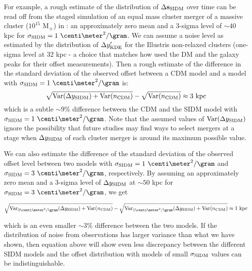 \documentclass[usenatbib]{mn2e}
\newcommand{\offset}{\Delta {\bf s}}
\newcommand{\SIDM}{{\rm SIDM}}
\newcommand{\Var}{\mathrm{Var}}
\begin{document}
{For example, a rough estimate of the distribution of $\offset_\SIDM$ over time 
can be read off from the staged simulation of an equal mass cluster merger of a
massive cluster ($10^{15}$ M$_\sun$) in \cite{Kim:2016}: an approximately zero mean and a 3-sigma level of
$\sim 40$ kpc for $\sigma_\SIDM = 1~\centi\meter^2 / \gram$.  
We can assume a noise level as estimated by the distribution of $\Delta y_{\rm KDE}'$
for the Illustris non-relaxed clusters (one-sigma level at 32 kpc - a choice that matches 
how \cite{Kim:2016} used the DM and the galaxy peaks for their offset measurements). 
Then a rough estimate of the difference in the standard deviation of the observed offset 
between a CDM model and a model with $\sigma_\SIDM = 1~\centi\meter^2 / \gram$ is:
\begin{equation}
\sqrt{\Var(\Delta y_\SIDM) + \Var(n_{\rm CDM})} - \sqrt{\Var(n_{\rm CDM})}  \approx 3~\mathrm{kpc} 
\end{equation}
which is a subtle $\sim 9 \%$ difference between the CDM and the SIDM model with
$\sigma_\SIDM = 1~\centi \meter^2 / \gram$. 
Note that the assumed values of $\Var(\Delta y_\SIDM)$  
ignore the possibility
that future studies may find ways to select mergers at a stage when $\Delta y_\SIDM$
of each cluster merger is around its maximum possible value. 

We can also estimate the difference of the standard deviation of the observed
offset level between two models with 
$\sigma_\SIDM =1~\centi\meter^2 / \gram$ and  $\sigma_\SIDM = 3~\centi\meter^2 / \gram$, respectively.
By assuming an approximately zero mean and a 3-sigma level of $\Delta y_\SIDM$
at $\sim 50$ kpc for $\sigma_\SIDM =
3~\centi\meter^2 / \gram$, we get

\begin{dmath}
\nonumber
	\sqrt{\Var_{3\centi\meter^2/\gram}(\Delta y_\SIDM) + \Var(n_{\rm CDM})} \hfill -
	\nonumber
	 \sqrt{\Var_{1\centi\meter^2/\gram}(\Delta y_{\SIDM}) +\Var(n_{\rm
	CDM})}\label{eq:variance_difference} \approx 1~\mathrm{kpc} 
\label{eq:variance_difference} 
\end{dmath}


which is an even smaller $\sim 3\%$ difference between the two models. 
If the distribution of noise from observations has larger variance than what we
have shown, then equation above will show even less discrepancy
between the different SIDM models and the offset distribution with models of small $\sigma_\SIDM$ values 
can be indistinguishable.  

}
\end{document}

